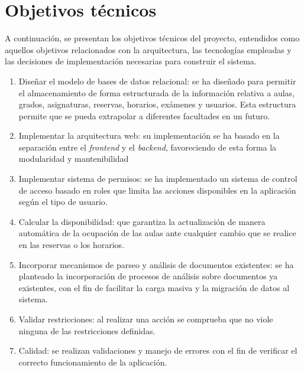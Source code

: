 \section{Objetivos técnicos}

A continuación, se presentan los objetivos técnicos del proyecto, entendidos como aquellos objetivos relacionados con la arquitectura, las tecnologías empleadas y las decisiones de implementación necesarias para construir el sistema.

\begin{enumerate}
	\item Diseñar el modelo de bases de datos relacional: se ha diseñado para permitir el almacenamiento de forma estructurada de la información relativa a aulas, grados, asignaturas, reservas, horarios, exámenes y usuarios. Esta estructura permite que se pueda extrapolar a diferentes facultades en un futuro.
	\item Implementar la arquitectura web: su implementación se ha basado en la separación entre el \textit{frontend} y el \textit{backend}, favoreciendo de esta forma la modularidad y mantenibilidad
	\item Implementar sistema de permisos: se ha implementado un sistema de control de acceso basado en roles que limita las acciones disponibles en la aplicación según el tipo de usuario.
	\item Calcular la disponibilidad: que garantiza la actualización de manera automática de la ocupación de las aulas ante cualquier cambio que se realice en las reservas o los horarios.
	\item Incorporar mecanismos de parseo y análisis de documentos existentes: se ha planteado la incorporación de procesos de análisis sobre documentos ya existentes, con el fin de facilitar la carga masiva y la migración de datos al sistema.
	\item Validar restricciones: al realizar una acción se comprueba que no viole ninguna de las restricciones definidas.
	\item Calidad: se realizan validaciones y manejo de errores con el fin de verificar el correcto funcionamiento de la aplicación.
\end{enumerate}



